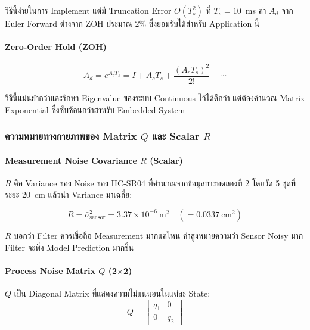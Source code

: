 วิธีนี้ง่ายในการ Implement แต่มี Truncation Error $O(T_s^2)$
ที่ $T_s = 10$~ms ค่า $A_d$ จาก Euler Forward ต่างจาก ZOH ประมาณ
$2\%$ ซึ่งยอมรับได้สำหรับ Application นี้

\paragraph{Zero-Order Hold (ZOH)}

\begin{equation}
    A_d = e^{A_c T_s} = I + A_c T_s + \frac{(A_c T_s)^2}{2!} + \cdots
    \label{eq:zoh_Ad}
\end{equation}

วิธีนี้แม่นยำกว่าและรักษา Eigenvalue ของระบบ Continuous ไว้ได้ดีกว่า
แต่ต้องคำนวณ Matrix Exponential ซึ่งซับซ้อนกว่าสำหรับ Embedded System


\subsubsection{ความหมายทางกายภาพของ Matrix $Q$ และ Scalar $R$}

\paragraph{Measurement Noise Covariance $R$ (Scalar)}

$R$ คือ Variance ของ Noise ของ HC-SR04 ที่คำนวณจากข้อมูลการทดลองที่ 2
โดยวัด 5 ชุดที่ระยะ 20~cm แล้วนำ Variance มาเฉลี่ย:

\begin{equation}
    R = \bar{\sigma}^2_\text{sensor} = 3.37 \times 10^{-6}\ \text{m}^2
    \quad (= 0.0337\ \text{cm}^2)
    \label{eq:R_exp5_nominal}
\end{equation}

$R$ บอกว่า Filter ควรเชื่อถือ Measurement มากแค่ไหน
ค่าสูงหมายความว่า Sensor Noisy มาก Filter จะพึ่ง Model Prediction มากขึ้น

\paragraph{Process Noise Matrix $Q$ (2$\times$2)}

$Q$ เป็น Diagonal Matrix ที่แสดงความไม่แน่นอนในแต่ละ State:
\begin{equation}
    Q = \begin{bmatrix} q_1 & 0 \\ 0 & q_2 \end{bmatrix}
    \label{eq:Q_structure}
\end{equation}

